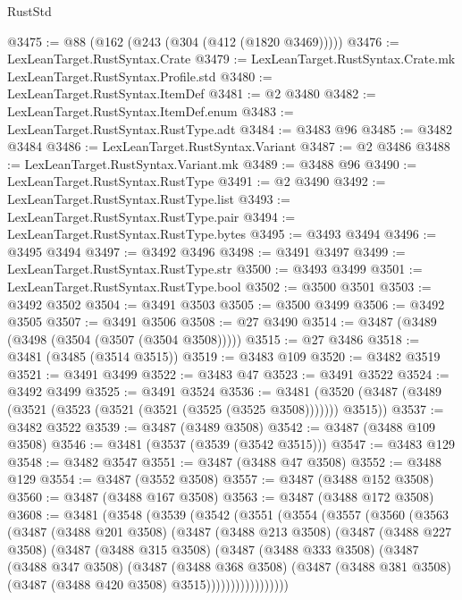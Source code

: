 \begin{lexlean}{RustStd}
\begin{coremodule}
@3475 := @88 (@162 (@243 (@304 (@412 (@1820 @3469)))))
@3476 := LexLeanTarget.RustSyntax.Crate
@3479 := LexLeanTarget.RustSyntax.Crate.mk LexLeanTarget.RustSyntax.Profile.std
@3480 := LexLeanTarget.RustSyntax.ItemDef
@3481 := @2 @3480
@3482 := LexLeanTarget.RustSyntax.ItemDef.enum
@3483 := LexLeanTarget.RustSyntax.RustType.adt
@3484 := @3483 @96
@3485 := @3482 @3484
@3486 := LexLeanTarget.RustSyntax.Variant
@3487 := @2 @3486
@3488 := LexLeanTarget.RustSyntax.Variant.mk
@3489 := @3488 @96
@3490 := LexLeanTarget.RustSyntax.RustType
@3491 := @2 @3490
@3492 := LexLeanTarget.RustSyntax.RustType.list
@3493 := LexLeanTarget.RustSyntax.RustType.pair
@3494 := LexLeanTarget.RustSyntax.RustType.bytes
@3495 := @3493 @3494
@3496 := @3495 @3494
@3497 := @3492 @3496
@3498 := @3491 @3497
@3499 := LexLeanTarget.RustSyntax.RustType.str
@3500 := @3493 @3499
@3501 := LexLeanTarget.RustSyntax.RustType.bool
@3502 := @3500 @3501
@3503 := @3492 @3502
@3504 := @3491 @3503
@3505 := @3500 @3499
@3506 := @3492 @3505
@3507 := @3491 @3506
@3508 := @27 @3490
@3514 := @3487 (@3489 (@3498 (@3504 (@3507 (@3504 @3508)))))
@3515 := @27 @3486
@3518 := @3481 (@3485 (@3514 @3515))
@3519 := @3483 @109
@3520 := @3482 @3519
@3521 := @3491 @3499
@3522 := @3483 @47
@3523 := @3491 @3522
@3524 := @3492 @3499
@3525 := @3491 @3524
@3536 := @3481 (@3520 (@3487 (@3489 (@3521 (@3523 (@3521 (@3521 (@3525 (@3525 @3508))))))) @3515))
@3537 := @3482 @3522
@3539 := @3487 (@3489 @3508)
@3542 := @3487 (@3488 @109 @3508)
@3546 := @3481 (@3537 (@3539 (@3542 @3515)))
@3547 := @3483 @129
@3548 := @3482 @3547
@3551 := @3487 (@3488 @47 @3508)
@3552 := @3488 @129
@3554 := @3487 (@3552 @3508)
@3557 := @3487 (@3488 @152 @3508)
@3560 := @3487 (@3488 @167 @3508)
@3563 := @3487 (@3488 @172 @3508)
@3608 := @3481
    (@3548
      (@3539
        (@3542
          (@3551
            (@3554
              (@3557
                (@3560
                  (@3563
                    (@3487
                      (@3488 @201 @3508)
                      (@3487
                        (@3488 @213 @3508)
                        (@3487
                          (@3488 @227 @3508)
                          (@3487
                            (@3488 @315 @3508)
                            (@3487
                              (@3488 @333 @3508)
                              (@3487
                                (@3488 @347 @3508)
                                (@3487
                                  (@3488 @368 @3508)
                                  (@3487
                                    (@3488 @381 @3508)
                                    (@3487 (@3488 @420 @3508) @3515)))))))))))))))))

\end{coremodule}
\end{lexlean}

